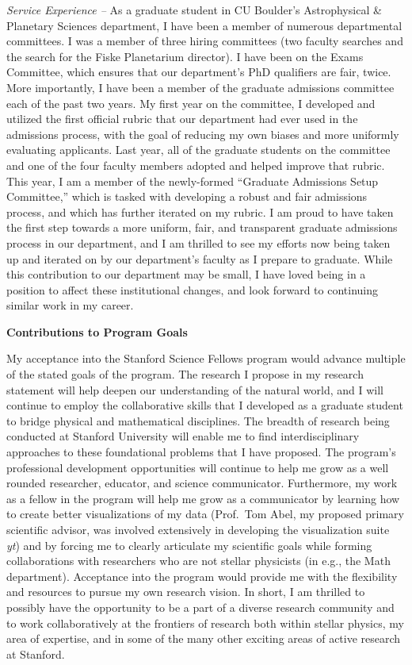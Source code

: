 \documentclass[onecolumn, 11pt, hmargin=1in, vmargin=1in]{aastex62}
\begin{document}
\emph{Service Experience --}
As a graduate student in CU Boulder's Astrophysical \& Planetary Sciences department, I have been a member of numerous departmental committees.
I was a member of three hiring committees (two faculty searches and the search for the Fiske Planetarium director).
I have been on the Exams Committee, which ensures that our department's PhD qualifiers are fair, twice.
More importantly, I have been a member of the graduate admissions committee each of the past two years.
My first year on the committee, I developed and utilized the first official rubric that our department had ever used in the admissions process, with the goal of reducing my own biases and more uniformly evaluating applicants.
Last year, all of the graduate students on the committee and one of the four faculty members adopted and helped improve that rubric.
This year, I am a member of the newly-formed ``Graduate Admissions Setup Committee,'' which is tasked with developing a robust and fair admissions process, and which has further iterated on my rubric.
I am proud to have taken the first step towards a more uniform, fair, and transparent graduate admissions process in our department, and I am thrilled to see my efforts now being taken up and iterated on by our department's faculty as I prepare to graduate.
While this contribution to our department may be small, I have loved being in a position to affect these institutional changes, and look forward to continuing similar work in my career.


\begin{center}
\textbf{Contributions to Program Goals}
\vspace{-6pt}
\end{center}

My acceptance into the Stanford Science Fellows program would advance multiple of the stated goals of the program.
The research I propose in my research statement will help deepen our understanding of the natural world, and I will continue to employ the collaborative skills that I developed as a graduate student to bridge physical and mathematical disciplines.
The breadth of research being conducted at Stanford University will enable me to find interdisciplinary approaches to these foundational problems that I have proposed.
The program's professional development opportunities will continue to help me grow as a well rounded researcher, educator, and science communicator.
Furthermore, my work as a fellow in the program will help me grow as a communicator by learning how to create better visualizations of my data (Prof.~Tom Abel, my proposed primary scientific advisor, was involved extensively in developing the visualization suite \emph{yt}) and by forcing me to clearly articulate my scientific goals while forming collaborations with researchers who are not stellar physicists (in e.g., the Math department). 
Acceptance into the program would provide me with the flexibility and resources to pursue my own research vision.
In short, I am thrilled to possibly have the opportunity to be a part of a diverse research community and to work collaboratively at the frontiers of research both within stellar physics, my area of expertise, and in some of the many other exciting areas of active research at Stanford.



\end{document}
